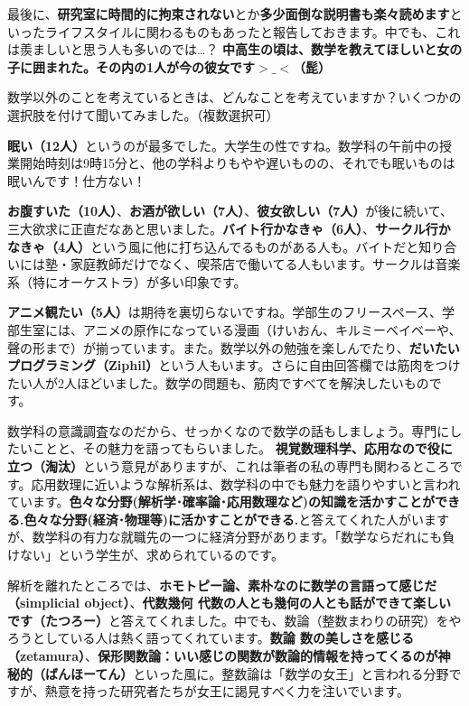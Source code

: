 最後に、\textbf{研究室に時間的に拘束されない}とか\textbf{多少面倒な説明書も楽々読めます}といったライフスタイルに関わるものもあったと報告しておきます。中でも、これは羨ましいと思う人も多いのでは…？
\textbf{中高生の頃は、数学を教えてほしいと女の子に囲まれた。その内の1人が今の彼女です$>\_<$（髭）}

数学以外のことを考えているときは、どんなことを考えていますか？いくつかの選択肢を付けて聞いてみました。（複数選択可）

\textbf{眠い（12人）}というのが最多でした。大学生の性ですね。数学科の午前中の授業開始時刻は9時15分と、他の学科よりもやや遅いものの、それでも眠いものは眠いんです！仕方ない！

\textbf{お腹すいた（10人）}、\textbf{お酒が欲しい（7人）}、\textbf{彼女欲しい（7人）}が後に続いて、三大欲求に正直だなあと思いました。\textbf{バイト行かなきゃ（6人）}、\textbf{サークル行かなきゃ（4人）}という風に他に打ち込んでるものがある人も。バイトだと知り合いには塾・家庭教師だけでなく、喫茶店で働いてる人もいます。サークルは音楽系（特にオーケストラ）が多い印象です。

\textbf{アニメ観たい（5人）}は期待を裏切らないですね。学部生のフリースペース、学部生室には、アニメの原作になっている漫画（けいおん、キルミーベイベーや、聲の形まで）が揃っています。また。数学以外の勉強を楽しんでたり、\textbf{だいたいプログラミング（Ziphil）}という人もいます。さらに自由回答欄では筋肉をつけたい人が2人ほどいました。数学の問題も、筋肉ですべてを解決したいものです。

数学科の意識調査なのだから、せっかくなので数学の話もしましょう。専門にしたいことと、その魅力を語ってもらいました。
\textbf{視覚数理科学、応用なので役に立つ（淘汰）}という意見がありますが、これは筆者の私の専門も関わるところです。応用数理に近いような解析系は、数学科の中でも魅力を語りやすいと言われています。\textbf{色々な分野(解析学･確率論･応用数理など)の知識を活かすことができる.色々な分野(経済･物理等)に活かすことができる.}と答えてくれた人がいますが、数学科の有力な就職先の一つに経済分野があります。「数学ならだれにも負けない」という学生が、求められているのです。

解析を離れたところでは、\textbf{ホモトピー論、素朴なのに数学の言語って感じだ（simplicial object）}、\textbf{代数幾何 代数の人とも幾何の人とも話ができて楽しいです（たつろー）}と答えてくれました。中でも、数論（整数まわりの研究）をやろうとしている人は熱く語ってくれています。\textbf{数論 数の美しさを感じる（zetamura）}、\textbf{保形関数論：いい感じの関数が数論的情報を持ってくるのが神秘的（ばんほーてん）}といった風に。整数論は「数学の女王」と言われる分野ですが、熱意を持った研究者たちが女王に謁見すべく力を注いでいます。


